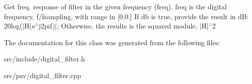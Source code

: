 Get freq. response of filter in the given frequency (freq). freq is the digital frequency, f/fsampling, with range in \mbox{[}0,0.\mbox{]} If db is true, provide the result in dB\+: 20log($\vert$H(e$^\wedge$j2pif)$\vert$; Otherwise, the results is the squared module, $\vert$\+H$\vert$$^\wedge$2 

The documentation for this class was generated from the following files\+:\begin{DoxyCompactItemize}
\item 
src/include/digital\+\_\+filter.\+h\item 
src/pav/digital\+\_\+filter.\+cpp\end{DoxyCompactItemize}
